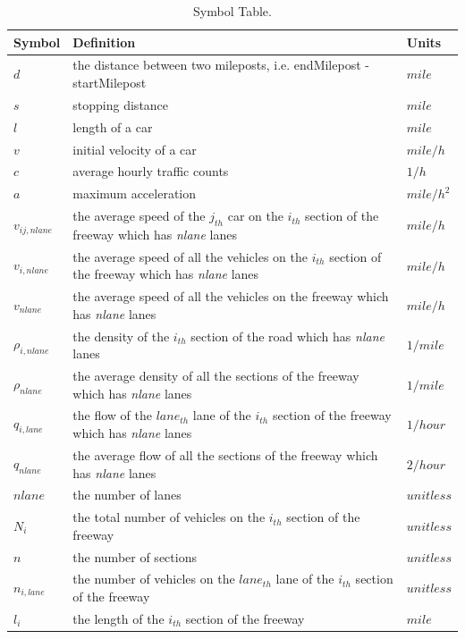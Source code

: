 \documentclass[a4paper]{article}
\begin{document}
	\begin{table}[H]
		\centering
		\begin{tabular}{lll}
			\toprule
			Symbol & Definition & Units \\
			\midrule
			$d$   & the distance between two mileposts, i.e. endMilepost - startMilepost & $mile$ \\
			$s$   & stopping distance & $mile$ \\
			$l$   & length of a car & $mile$ \\
			$v$   & initial velocity of a car & $mile/h$ \\
			$c$   & average hourly traffic counts & $1/h$ \\
			$a$   & maximum acceleration & $mile/h^2$ \\
			$v_{ij,nlane}$ & the average speed of the $j_{th}$ car on the $i_{th}$ section of the freeway which has \textit{nlane} lanes & $mile/h$ \\
			$v_{i,nlane}$ & the average speed of all the vehicles on the $i_{th}$ section of the freeway which has \textit{nlane} lanes & $mile/h$ \\
			$v_{nlane}$ & the average speed of all the vehicles on the freeway which has \textit{nlane} lanes & $mile/h$ \\
			$\rho_{i,nlane}$ & the density of the $i_{th}$ section of the road which has \textit{nlane} lanes & $1/mile$ \\
			$\rho_{nlane}$ & the average density of all the sections of the freeway which has \textit{nlane} lanes & $1/mile$ \\
			$q_{i,lane}$ & the flow of the $lane_{th}$ lane of the $i_{th}$ section of the freeway which has \textit{nlane} lanes & $1/hour$ \\
			$q_{nlane}$ & the average flow of all the sections of the freeway which has \textit{nlane} lanes & $2/hour$ \\
			$nlane$ & the number of lanes & $unitless$ \\
			${N_i}$ & the total number of vehicles on the $i_{th}$ section of the freeway & $unitless$ \\
			$n$   & the number of sections & $unitless$ \\
			$n_{i,lane}$ & the number of vehicles on the $lane_{th}$ lane of the $i_{th}$ section of the freeway & $unitless$ \\
			$l_i$ & the length of the $i_{th}$ section of the freeway & $mile$ \\
			\bottomrule
		\end{tabular}
		\caption{Symbol Table.}
		\label{t1}
	\end{table}
	
\end{document}
